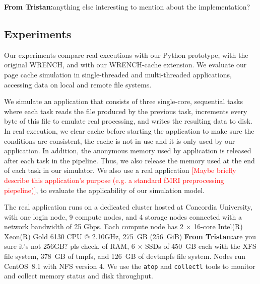 \documentclass[conference]{IEEEtran}
\newcommand{\tristan}[1]{\color{orange}\textbf{From Tristan:}#1\color{black}}
\begin{document}
\tristan{anything else interesting to mention about the implementation?}

        \subsection{Experiments}

        Our experiments compare real executions with our Python prototype,
        with the original WRENCH, and with our WRENCH-cache extension. We
        evaluate our page cache simulation in single-threaded and
        multi-threaded applications, accessing data on local and remote
        file systems.

        We simulate an application that consists of three single-core, sequential tasks
        where each task reads the file produced by the previous task,
        increments every byte of this file to emulate real processing, and
        writes the resulting data to disk. 
        In real execution, we clear cache before starting the application to make sure 
        the conditions are consistent, the cache is not in use and it is only used by 
        our application.
        In addition, the anonymous memory used by application 
        is released after each task in the pipeline. 
        Thus, we also release the memory used at the end of each task in our simulator.
        We also use a real application
        \textcolor{red}{[Maybe briefly describe this application's purpose
        (e.g. a standard fMRI preprocessing piepeline)]}, to evaluate the
        applicability of our simulation model.

        The real application runs on a dedicated cluster hosted at
        Concordia University, with one login node, 9 compute nodes, and 4
        storage nodes connected with a network bandwidth of 25 Gbps. Each
        compute node has 2 $\times$ 16-core Intel(R) Xeon(R) Gold 6130 CPU
        @ 2.10GHz, 275~GB (256~GiB) \tristan{are you sure it's not 256GB?
        pls check.} of RAM, 6 $\times$ SSDs of 450~GB each with the XFS
        file system, 378~GB of tmpfs, and 126~GB of devtmpfs file system.
        Nodes run CentOS~8.1 with NFS version 4. We use the \texttt{atop}
        and \texttt{collectl} tools to monitor and collect memory status
        and disk throughput.
\end{document}
